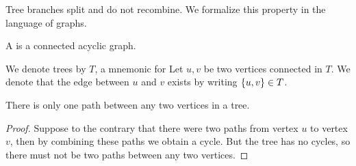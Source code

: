 
\sbasic






\sstart
{}


Tree branches split
and do not recombine.
We formalize this
property in the
language of graphs.


A
is a
connected
acyclic graph.


We denote trees by $T$,
a mnemonic for 
Let $u, v$ be two vertices
connected in $T$.
We denote that the edge
between $u$ and $v$ exists
by writing $\{u, v\} \in T$.


\begin{prop}
  There is only one
  path between
  any two vertices in a tree.

\begin{proof}
  Suppose to the contrary that
  there were two paths from
  vertex $u$ to vertex $v$,
  then by combining these paths
  we obtain a cycle. But the
  tree has no cycles,
  so there must not be two paths
  between any two vertices.
\end{proof}
\end{prop}
\strats

